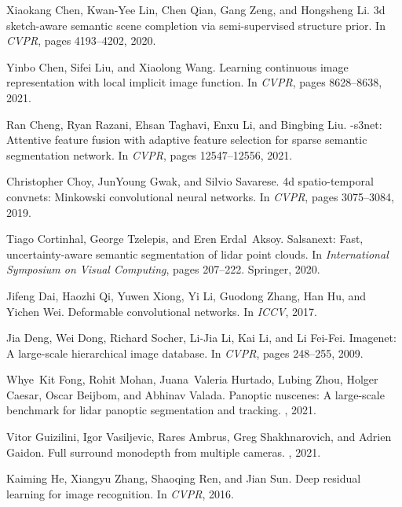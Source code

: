 \documentclass[10pt,twocolumn,letterpaper]{article}
\begin{document}
{\begin{thebibliography}{10}
Xiaokang Chen, Kwan-Yee Lin, Chen Qian, Gang Zeng, and Hongsheng Li.
\newblock 3d sketch-aware semantic scene completion via semi-supervised
  structure prior.
\newblock In {\em CVPR}, pages 4193--4202, 2020.

Yinbo Chen, Sifei Liu, and Xiaolong Wang.
\newblock Learning continuous image representation with local implicit image
  function.
\newblock In {\em CVPR}, pages 8628--8638, 2021.

Ran Cheng, Ryan Razani, Ehsan Taghavi, Enxu Li, and Bingbing Liu.
-s3net: Attentive feature fusion with adaptive feature selection for
  sparse semantic segmentation network.
\newblock In {\em CVPR}, pages 12547--12556, 2021.

Christopher Choy, JunYoung Gwak, and Silvio Savarese.
\newblock 4d spatio-temporal convnets: Minkowski convolutional neural networks.
\newblock In {\em CVPR}, pages 3075--3084, 2019.

Tiago Cortinhal, George Tzelepis, and Eren Erdal~Aksoy.
\newblock Salsanext: Fast, uncertainty-aware semantic segmentation of lidar
  point clouds.
\newblock In {\em International Symposium on Visual Computing}, pages 207--222.
  Springer, 2020.

Jifeng Dai, Haozhi Qi, Yuwen Xiong, Yi Li, Guodong Zhang, Han Hu, and Yichen
  Wei.
\newblock Deformable convolutional networks.
\newblock In {\em ICCV}, 2017.

Jia Deng, Wei Dong, Richard Socher, Li-Jia Li, Kai Li, and Li Fei-Fei.
\newblock Imagenet: A large-scale hierarchical image database.
\newblock In {\em CVPR}, pages 248--255, 2009.

Whye~Kit Fong, Rohit Mohan, Juana~Valeria Hurtado, Lubing Zhou, Holger Caesar,
  Oscar Beijbom, and Abhinav Valada.
\newblock Panoptic nuscenes: A large-scale benchmark for lidar panoptic
  segmentation and tracking.
, 2021.

Vitor Guizilini, Igor Vasiljevic, Rares Ambrus, Greg Shakhnarovich, and Adrien
  Gaidon.
\newblock Full surround monodepth from multiple cameras.
, 2021.

Kaiming He, Xiangyu Zhang, Shaoqing Ren, and Jian Sun.
\newblock Deep residual learning for image recognition.
\newblock In {\em CVPR}, 2016.


\end{thebibliography}}
\end{document}
